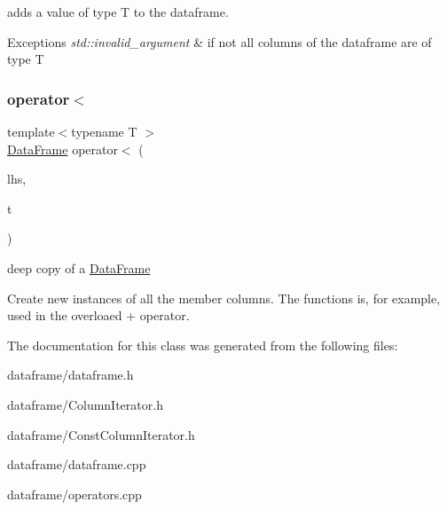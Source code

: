 adds a value of type T to the dataframe. 


\begin{DoxyExceptions}{Exceptions}
{\em std\+::invalid\+\_\+argument} & if not all columns of the dataframe are of type T \\
\hline
\end{DoxyExceptions}
\mbox{\label{classDataFrame_a8c08b940f5d6a095ac079ef277133c1a}} 
\subsubsection{\texorpdfstring{operator$<$}{operator<}}
{\footnotesize\ttfamily template$<$typename T $>$ \\
\hyperlink{classDataFrame}{Data\+Frame} operator$<$ (\begin{DoxyParamCaption}\item[{const \hyperlink{classDataFrame}{Data\+Frame} \&}]{lhs,  }\item[{const T \&}]{t }\end{DoxyParamCaption})\hspace{0.3cm}{\ttfamily [friend]}}



deep copy of a \hyperlink{classDataFrame}{Data\+Frame} 

Create new instances of all the member columns. The functions is, for example, used in the overloaed + operator. 

The documentation for this class was generated from the following files\+:\begin{DoxyCompactItemize}
\item 
dataframe/dataframe.\+h\item 
dataframe/Column\+Iterator.\+h\item 
dataframe/Const\+Column\+Iterator.\+h\item 
dataframe/dataframe.\+cpp\item 
dataframe/operators.\+cpp\end{DoxyCompactItemize}
